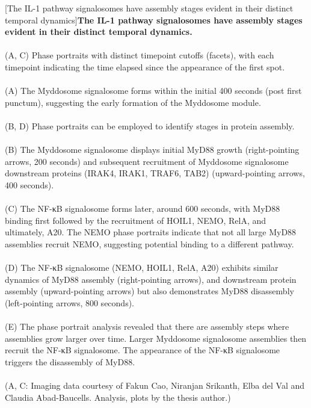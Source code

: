 \begin{centering}
\captionsetup{parbox=none}
[The IL-1 pathway signalosomes have assembly stages evident in their distinct temporal dynamics]{\textbf{The IL-1 pathway signalosomes have assembly stages evident in their distinct temporal dynamics.}
\\
\\
(A, C) Phase portraits with distinct timepoint cutoffs (facets), with each timepoint indicating the time elapsed since the appearance of the first spot.
\\
\\
(A) The Myddosome signalosome forms within the initial 400 seconds (post first punctum), suggesting the early formation of the Myddosome module.
\\
\\
(B, D) Phase portraits can be employed to identify stages in protein assembly.
\\
\\
(B) The Myddosome signalosome displays initial MyD88 growth (right-pointing arrows, 200 seconds) and subsequent recruitment of Myddosome signalosome downstream proteins (IRAK4, IRAK1, TRAF6, TAB2) (upward-pointing arrows, 400 seconds).
\\
\\
(C) The NF-κB signalosome forms later, around 600 seconds, with MyD88 binding first followed by the recruitment of HOIL1, NEMO, RelA, and ultimately, A20. The NEMO phase portraits indicate that not all large MyD88 assemblies recruit NEMO, suggesting potential binding to a different pathway.
\\
\\
(D) The NF-κB signalosome (NEMO, HOIL1, RelA, A20) exhibits similar dynamics of MyD88 assembly (right-pointing arrows), and downstream protein assembly (upward-pointing arrows) but also demonstrates MyD88 disassembly (left-pointing arrows, 800 seconds).
\\
\\
(E) The phase portrait analysis revealed that there are assembly steps where assemblies grow larger over time. Larger Myddosome signalosome assemblies then recruit the NF-κB signalosome. The appearance of the NF-κB signalosome triggers the disassembly of MyD88.
\\
\\
(A, C: Imaging data courtesy of Fakun Cao, Niranjan Srikanth, Elba del Val and Claudia Abad-Baucells. Analysis, plots by the thesis author.)}
\label{p2:4}
\end{centering}

